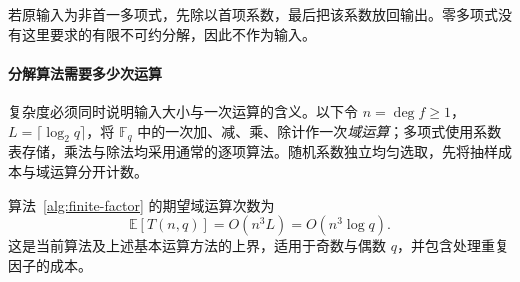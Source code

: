\documentclass[lang=cn,a4paper,fontset=none,zihao=false,10pt,openany,twoside]{beautybook}
\numberwithin{algorithm}{chapter}
\begin{document}
若原输入为非首一多项式，先除以首项系数，最后把该系数放回输出。零多项式没有这里要求的有限不可约分解，因此不作为输入。

\paragraph{分解算法需要多少次运算}
复杂度必须同时说明输入大小与一次运算的含义。以下令 $n=\deg f\ge1$，$L=\lceil\log_2q\rceil$，将 $\mathbb F_q$ 中的一次加、减、乘、除计作一次\emph{域运算}；多项式使用系数表存储，乘法与除法均采用通常的逐项算法。随机系数独立均匀选取，先将抽样成本与域运算分开计数。
\begin{proposition}[有限域分解的期望复杂度]\label{prop:finite-factor-cost}
算法~\ref{alg:finite-factor} 的期望域运算次数为
\[
 \mathbb E[T(n,q)]=O(n^3L)=O(n^3\log q).
\]
这是当前算法及上述基本运算方法的上界，适用于奇数与偶数 $q$，并包含处理重复因子的成本。
\end{proposition}
\end{document}
